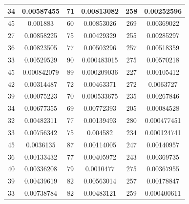 \documentclass{article}
\begin{document}
\begin{tabular}{cccccc}
34&0.00587455&71&0.00813082&258&0.00252596 \\ \hline
45&0.001883&60&0.00853026&269&0.00369022 \\ \hline
27&0.00858225&75&0.00429329&255&0.00285297 \\ \hline
36&0.00823505&77&0.00503296&257&0.00518359 \\ \hline
33&0.00529529&90&0.000483015&275&0.00570218 \\ \hline
45&0.000842079&89&0.000209036&227&0.00105412 \\ \hline
42&0.00314487&72&0.00463371&272&0.0063727 \\ \hline
39&0.00075223&70&0.000533675&235&0.00267846 \\ \hline
34&0.00677355&69&0.00772393&205&0.00084528 \\ \hline
32&0.00482311&77&0.00139493&280&0.000477451 \\ \hline
33&0.00756342&75&0.004582&234&0.000124741 \\ \hline
45&0.0036135&87&0.00114005&247&0.00140957 \\ \hline
36&0.00133432&77&0.00405972&243&0.00369735 \\ \hline
40&0.00336208&79&0.0010477&275&0.00367955 \\ \hline
39&0.00439619&82&0.00563014&257&0.00178847 \\ \hline
33&0.00738784&82&0.00483121&259&0.000400611 \\ \hline
\end{tabular}
\end{document}
